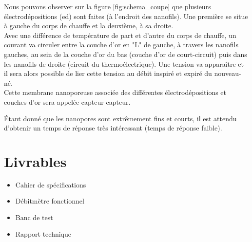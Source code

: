 Nous pouvons observer sur la figure \ref{fig:schema_coupe} que plusieurs électrodépositions (\gls{ed}) sont faites (à l'endroit des nanofils). Une première 
se situe à gauche du corps de chauffe et la deuxième, à sa droite. \\
Avec une différence de température de part et d'autre du corps de chauffe, un courant va circuler entre la couche d'or en "L" de gauche, à 
travers les nanofils gauches, au sein de la couche d'or du bas (couche d'or de court-circuit) puis dans les nanofils de droite (circuit du thermoélectrique). 
Une tension va apparaître et il sera alors possible de lier cette tension au débit inspiré et expiré du nouveau-né.\\
Cette membrane nanoporeuse associée des différentes électrodépositions et couches d'or sera appelée capteur \gls{capteur}. 

Étant donné que les nanopores sont extrêmement fins et courts, il est attendu d'obtenir un temps de réponse très intéressant (temps 
de réponse faible). 

\section{Livrables}
\begin{itemize}
    \item Cahier de spécifications
    \item Débitmètre fonctionnel
    \item Banc de test
    \item Rapport technique
\end{itemize}
